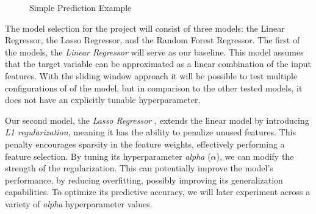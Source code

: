 \documentclass[12pt]{report} %
\begin{document}
\begin{figure}[H]
    \centering
    \caption{Simple Prediction Example}
    \label{fig:pred_example}
\end{figure}

The model selection for the project will consist of three models: the Linear Regressor, the Lasso Regressor, and the Random Forest Regressor. The first of the models, the \textit{Linear Regressor} \cite{linear_regression} will serve as our baseline. This model assumes that the target variable can be approximated as a linear combination of the input features. With the sliding window approach it will be possible to test multiple configurations of of the model, but in comparison to the other tested models, it does not have an explicitly tunable hyperparameter.

Our second model, the \textit{Lasso Regressor} \cite{lasso_regression}, extends the linear model by introducing \textit{L1 regularization}, meaning it has the ability to penalize unused features. This penalty encourages sparsity in the feature weights, effectively performing a feature selection. By tuning its hyperparameter \textit{alpha} ($\alpha$), we can modify the strength of the regularization. This can potentially improve the model's performance, by reducing overfitting, possibly improving its generalization capabilities. To optimize its predictive accuracy, we will later experiment across a variety of \textit{alpha} hyperparameter values.
\end{document}
